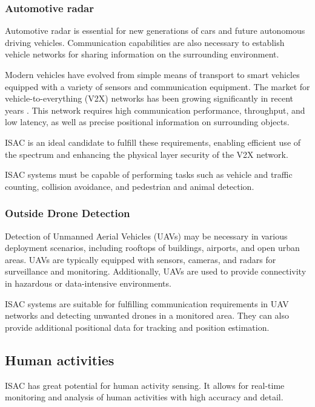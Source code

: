 	\subsubsection{Automotive radar}
	
	Automotive radar is essential for new generations of cars and future autonomous driving vehicles.
	Communication capabilities are also necessary to establish vehicle networks for sharing information on the surrounding environment.
	
	Modern vehicles have evolved from simple means of transport to smart vehicles equipped with a variety of sensors and communication equipment.
	The market for vehicle-to-everything (V2X) networks has been growing significantly in recent years \cite{Liu_Masouros_2021}.
	This network requires high communication performance, throughput, and low latency, as well as precise positional information on surrounding objects.
	
	ISAC is an ideal candidate to fulfill these requirements, enabling efficient use of the spectrum and enhancing the physical layer security of the V2X network.
	
	ISAC systems must be capable of performing tasks such as vehicle and traffic counting, collision avoidance, and pedestrian and animal detection.
	
	\subsubsection{Outside Drone Detection}
	
	Detection of Unmanned Aerial Vehicles (UAVs) may be necessary in various deployment scenarios, including rooftops of buildings, airports, and open urban areas.
	UAVs are typically equipped with sensors, cameras, and radars for surveillance and monitoring. Additionally, UAVs are used to provide connectivity in hazardous or data-intensive environments.

	ISAC systems are suitable for fulfilling communication requirements in UAV networks and detecting unwanted drones in a monitored area. They can also provide additional positional data for tracking and position estimation.
	
	\subsection{Human activities}
	
	ISAC has great potential for human activity sensing. It allows for real-time monitoring and analysis of human activities with high accuracy and detail. 
	
